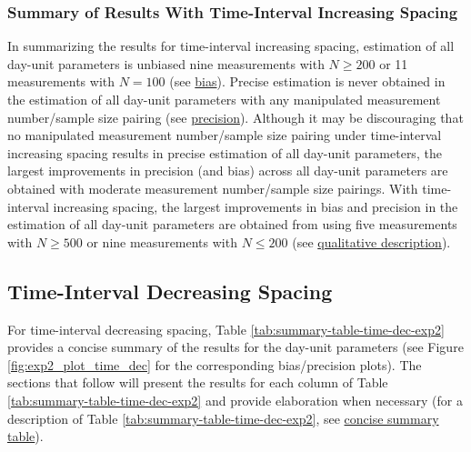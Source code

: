 \documentclass[
12pt, %
twoside,
english]{guelphthesis}
\begin{document}
\hypertarget{summary-of-results-with-time-interval-increasing-spacing-1}{%
\subsubsection{Summary of Results With Time-Interval Increasing Spacing}\label{summary-of-results-with-time-interval-increasing-spacing-1}}

In summarizing the results for time-interval increasing spacing, estimation of all day-unit parameters is unbiased nine measurements with \(N \ge 200\) or 11 measurements with \(N = 100\) (see \protect\hyperlink{bias-time-inc-exp2}{bias}). Precise estimation is never obtained in the estimation of all day-unit parameters with any manipulated measurement number/sample size pairing (see \protect\hyperlink{precision-time-inc-exp2}{precision}). Although it may be discouraging that no manipulated measurement number/sample size pairing under time-interval increasing spacing results in precise estimation of all day-unit parameters, the largest improvements in precision (and bias) across all day-unit parameters are obtained with moderate measurement number/sample size pairings. With time-interval increasing spacing, the largest improvements in bias and precision in the estimation of all day-unit parameters are obtained from using five measurements with \(N \ge 500\) or nine measurements with \(N \le 200\) (see \protect\hyperlink{qualitative-time-inc-exp2}{qualitative description}).

\hypertarget{time-interval-decreasing-spacing-1}{%
\subsection{Time-Interval Decreasing Spacing}\label{time-interval-decreasing-spacing-1}}

For time-interval decreasing spacing, Table \ref{tab:summary-table-time-dec-exp2} provides a concise summary of the results for the day-unit parameters (see Figure \ref{fig:exp2_plot_time_dec} for the corresponding bias/precision plots). The sections that follow will present the results for each column of Table \ref{tab:summary-table-time-dec-exp2} and provide elaboration when necessary (for a description of Table \ref{tab:summary-table-time-dec-exp2}, see \protect\hyperlink{concise-example}{concise summary table}).
\end{document}
